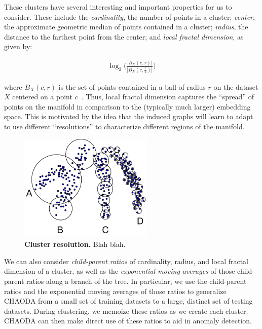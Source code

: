 These clusters have several interesting and important properties for us to consider.
These include the \textit{cardinality}, the number of points in a cluster;
\textit{center}, the approximate geometric median of points contained in a cluster;
\textit{radius}, the distance to the farthest point from the center;
and \textit{local fractal dimension},
as given by:

\begin{gather}
    \log_2\bigg(\frac{|B_X(c, r)|}{|B_X(c, \frac{r}{2})|}\bigg)
    \label{fractal-dimension}
\end{gather}

where $B_X(c,r)$ is the set of points contained in a ball of radius $r$ on the dataset $X$ centered on a point $c$~\cite{ishaq2019clustered}.
Thus, local fractal dimension captures the ``spread'' of points on the manifold in comparison to the (typically much larger) embedding space.
This is motivated by the idea that the induced graphs will learn to adapt to use different ``resolutions'' to characterize different regions of the manifold.

\begin{figure}[ht!]
    \centering
    \includegraphics[width=2.5in]{images/cluster-resolution.pdf}
    \caption{\textbf{Cluster resolution.}
        Blah blah.}
    \label{fig:methods:cluster-resolution}
\end{figure}

We can also consider \textit{child-parent ratios} of cardinality, radius, and local fractal dimension of a cluster, as well as the \textit{exponential moving averages} of those child-parent ratios along a branch of the tree.
In particular, we use the child-parent ratios and the exponential moving averages of those ratios to generalize CHAODA from a small set of training datasets to a large, distinct set of testing datasets.
During clustering, we memoize these ratios as we create each cluster.
CHAODA can then make direct use of these ratios to aid in anomaly detection.


